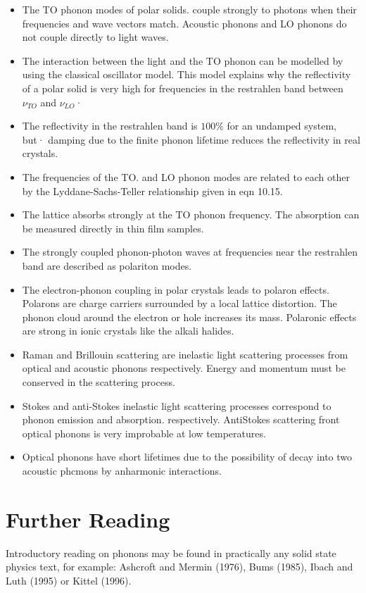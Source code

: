 \documentclass[12pt]{book}
\begin{document}
\begin{shaded}
\begin{itemize}
  \item The TO phonon modes of polar solids. couple strongly to photons when their frequencies and wave vectors match. Acoustic phonons and LO phonons do not couple directly to light waves.
  \item The interaction between the light and the TO phonon can be modelled by using the classical oscillator model. This model explains why the reflectivity of a polar solid is very high for frequencies in the restrahlen band between $\nu_{TO}$ and $\nu_{LO}$·
  \item The reflectivity in the restrahlen band is $100\%$ for an undamped system, but· damping due to the finite phonon lifetime reduces the reflectivity in real crystals.
  \item The frequencies of the TO. and LO phonon modes are related to each other by the Lyddane-Sachs-Teller relationship given in eqn 10.15.
  \item The lattice absorbs strongly at the TO phonon frequency. The absorption can be measured directly in thin film samples.
  \item The strongly coupled phonon-photon waves at frequencies near the restrahlen band are described as polariton modes.
  \item The electron-phonon coupling in polar crystals leads to polaron effects. Polarons are charge carriers surrounded by a local lattice distortion. The phonon cloud around the electron or hole increases its mass. Polaronic effects are strong in ionic crystals like the alkali halides.
  \item Raman and Brillouin scattering are inelastic light scattering processes from optical and acoustic phonons respectively. Energy and momentum must be conserved in the scattering process.
  \item Stokes and anti-Stokes inelastic light scattering processes correspond to phonon emission and absorption. respectively. AntiStokes scattering front optical phonons is very improbable at low temperatures.
  \item Optical phonons have short lifetimes due to the possibility of decay into two acoustic phcmons by anharmonic interactions.

\end{itemize}
\end{shaded}
\section*{Further Reading}
Introductory reading on phonons may be found in practically any solid state physics text, for example: Ashcroft and Mermin (1976), Bums (1985), Ibach and Luth (1995) or Kittel (1996).
\end{document}
